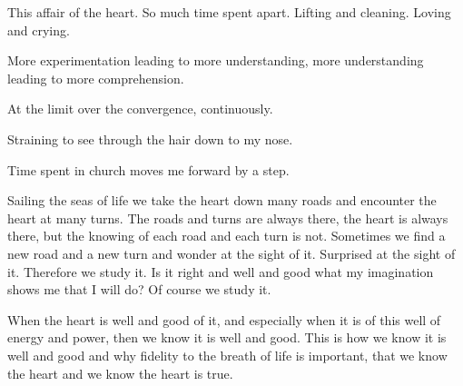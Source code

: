 \vfill
\break

This affair of the heart.  So much time spent apart.  Lifting and
cleaning.  Loving and crying.    

More experimentation leading to more understanding, more understanding
leading to more comprehension.

At the limit over the convergence, continuously.

\vfill
\break

Straining to see through the hair down to my nose.

\vfill
\break

Time spent in church moves me forward by a step.

\vfill
\break

Sailing the seas of life we take the heart down many roads and
encounter the heart at many turns.  The roads and turns are always
there, the heart is always there, but the knowing of each road and
each turn is not.  Sometimes we find a new road and a new turn and
wonder at the sight of it.  Surprised at the sight of it.  Therefore
we study it.  Is it right and well and good what my imagination shows
me that I will do?  Of course we study it.  

When the heart is well and good of it, and especially when it is of
this well of energy and power, then we know it is well and good.  This
is how we know it is well and good and why fidelity to the breath of
life is important, that we know the heart and we know the heart is
true.

\vfill
\bye
